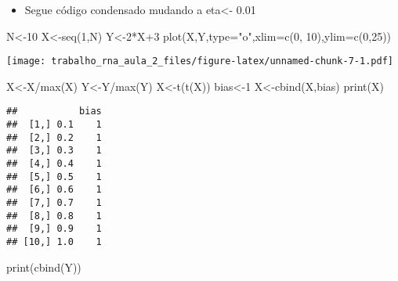 \documentclass[
]{article}
\newenvironment{Shaded}{\begin{snugshade}}{\end{snugshade}}
\newcommand{\AttributeTok}[1]{\textcolor[rgb]{0.77,0.63,0.00}{#1}}
\newcommand{\DecValTok}[1]{\textcolor[rgb]{0.00,0.00,0.81}{#1}}
\newcommand{\FunctionTok}[1]{\textcolor[rgb]{0.00,0.00,0.00}{#1}}
\newcommand{\NormalTok}[1]{#1}
\newcommand{\OtherTok}[1]{\textcolor[rgb]{0.56,0.35,0.01}{#1}}
\newcommand{\SpecialCharTok}[1]{\textcolor[rgb]{0.00,0.00,0.00}{#1}}
\newcommand{\StringTok}[1]{\textcolor[rgb]{0.31,0.60,0.02}{#1}}
\providecommand{\tightlist}{%
  \setlength{\itemsep}{0pt}\setlength{\parskip}{0pt}}
\begin{document}
\begin{itemize}
\tightlist
\item
  Segue código condensado mudando a eta\textless- 0.01
\end{itemize}

\begin{Shaded}
\begin{Highlighting}[]
\NormalTok{N}\OtherTok{\textless{}{-}}\DecValTok{10}
\NormalTok{X}\OtherTok{\textless{}{-}}\FunctionTok{seq}\NormalTok{(}\DecValTok{1}\NormalTok{,N)}
\NormalTok{Y}\OtherTok{\textless{}{-}}\DecValTok{2}\SpecialCharTok{*}\NormalTok{X}\SpecialCharTok{+}\DecValTok{3}
\FunctionTok{plot}\NormalTok{(X,Y,}\AttributeTok{type=}\StringTok{"o"}\NormalTok{,}\AttributeTok{xlim=}\FunctionTok{c}\NormalTok{(}\DecValTok{0}\NormalTok{, }\DecValTok{10}\NormalTok{),}\AttributeTok{ylim=}\FunctionTok{c}\NormalTok{(}\DecValTok{0}\NormalTok{,}\DecValTok{25}\NormalTok{))}
\end{Highlighting}
\end{Shaded}

\texttt{[image: trabalho\_rna\_aula\_2\_files/figure-latex/unnamed-chunk-7-1.pdf]}

\begin{Shaded}
\begin{Highlighting}[]
\NormalTok{X}\OtherTok{\textless{}{-}}\NormalTok{X}\SpecialCharTok{/}\FunctionTok{max}\NormalTok{(X)}
\NormalTok{Y}\OtherTok{\textless{}{-}}\NormalTok{Y}\SpecialCharTok{/}\FunctionTok{max}\NormalTok{(Y)}
\NormalTok{X}\OtherTok{\textless{}{-}}\FunctionTok{t}\NormalTok{(}\FunctionTok{t}\NormalTok{(X))}
\NormalTok{bias}\OtherTok{\textless{}{-}}\DecValTok{1}
\NormalTok{X}\OtherTok{\textless{}{-}}\FunctionTok{cbind}\NormalTok{(X,bias)}
\FunctionTok{print}\NormalTok{(X)}
\end{Highlighting}
\end{Shaded}

\begin{verbatim}
##           bias
##  [1,] 0.1    1
##  [2,] 0.2    1
##  [3,] 0.3    1
##  [4,] 0.4    1
##  [5,] 0.5    1
##  [6,] 0.6    1
##  [7,] 0.7    1
##  [8,] 0.8    1
##  [9,] 0.9    1
## [10,] 1.0    1
\end{verbatim}

\begin{Shaded}
\begin{Highlighting}[]
\FunctionTok{print}\NormalTok{(}\FunctionTok{cbind}\NormalTok{(Y))}
\end{Highlighting}
\end{Shaded}
\end{document}
